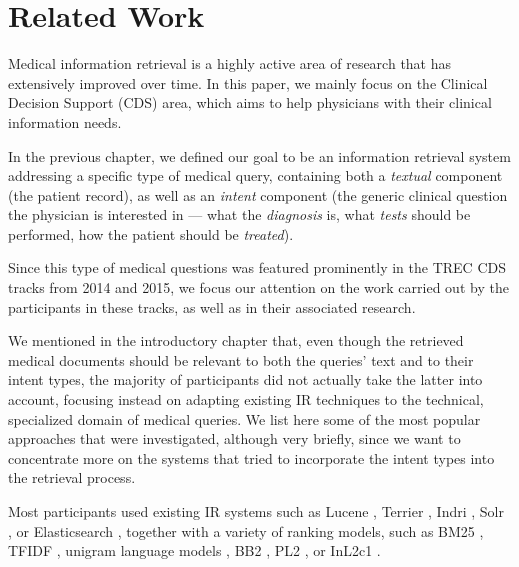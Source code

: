 \chapter{Related Work} \label{related}

Medical information retrieval is a highly active area of research that has extensively improved over time.
In this paper, we mainly focus on the Clinical Decision Support (CDS) area, which aims to help
physicians with their clinical information needs.

In the previous chapter, we defined our goal to be
an information retrieval system addressing a specific type of medical query,
containing both a \emph{textual} component (the patient record), as well as an \emph{intent} component
(the generic clinical question the physician is interested in
--- what the \emph{diagnosis} is, what \emph{tests} should be performed, how the patient should be \emph{treated}).

Since this type of medical questions was featured prominently in the TREC CDS tracks from 2014 and 2015,
we focus our attention on the work carried out by the participants in these tracks, as well as in
 their associated research.

We mentioned in the introductory chapter that, even though the retrieved medical documents should be
relevant to both the queries' text and to their intent types, the majority of participants
did not actually take the latter into account, focusing instead on adapting existing
IR techniques to the technical, specialized domain of medical queries. We list here some of the most
popular approaches that were investigated, although very briefly, since we want to concentrate more on the systems that
tried to incorporate the intent types into the retrieval process.

Most participants used existing IR systems such as
Lucene \cite{ucla, goodwin2014utd, jiang2016clinical, oh2014kisti, novasearch, CSEIITV, wei2014atigeo},
Terrier \cite{dinh2014crp, snomeddawit, bitem, waterloo, song2015ecnu, mutrec, sankhavara2014fusing, cuhk},
Indri \cite{ir.cs.sfsu, choi, duth, wei2014atigeo, wsuir},
Solr \cite{waterloo},
or Elasticsearch \cite{lamda2015},
together with a variety of ranking models, such as
BM25 \cite{dinh2014crp, snomeddawit, bitem, goodwin2014utd, novasearch, song2015ecnu},
TFIDF \cite{dinh2014crp, ucla, novasearch},
unigram language models \cite{ir.cs.sfsu, choi, ucla, oh2014kisti, novasearch},
BB2 \cite{song2015ecnu},
PL2 \cite{waterloo, song2015ecnu},
or InL2c1 \cite{snomeddawit}.

